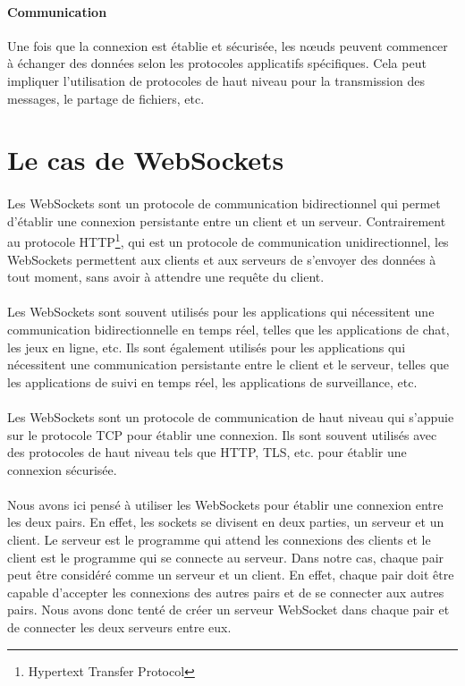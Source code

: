 \paragraph{Communication }
Une fois que la connexion est établie et sécurisée, les nœuds peuvent commencer à échanger des données selon les protocoles applicatifs spécifiques. Cela peut impliquer l'utilisation de protocoles de haut niveau pour la transmission des messages, le partage de fichiers, etc.


\section{Le cas de WebSockets}

\paragraph{}
Les WebSockets sont un protocole de communication bidirectionnel qui permet d'établir une connexion persistante entre un client et un serveur. Contrairement au protocole HTTP\footnote{Hypertext Transfer Protocol}, qui est un protocole de communication unidirectionnel, 
les WebSockets permettent aux clients et aux serveurs de s'envoyer des données à tout moment, sans avoir à attendre une requête du client. 

\paragraph{}
Les WebSockets sont souvent utilisés pour les applications qui nécessitent une communication bidirectionnelle en temps réel, telles que les applications de chat, les jeux en ligne, etc. Ils sont également utilisés pour les applications qui nécessitent une communication
persistante entre le client et le serveur, telles que les applications de suivi en temps réel, les applications de surveillance, etc. 

\paragraph{}
Les WebSockets sont un protocole de communication de haut niveau qui s'appuie sur le protocole TCP pour établir une connexion. Ils sont souvent utilisés avec des protocoles de haut niveau tels que HTTP, TLS, etc. pour établir une connexion sécurisée.

\paragraph{}
Nous avons ici pensé à utiliser les WebSockets pour établir une connexion entre les deux pairs. En effet, les sockets se divisent en deux parties, un serveur et un client. Le serveur est le programme qui attend les connexions des clients et le client est le programme qui se connecte au serveur.
Dans notre cas, chaque pair peut être considéré comme un serveur et un client. En effet, chaque pair doit être capable d'accepter les connexions des autres pairs et de se connecter aux autres pairs. Nous avons donc tenté de créer un serveur WebSocket dans chaque pair et de connecter les deux serveurs entre eux.

